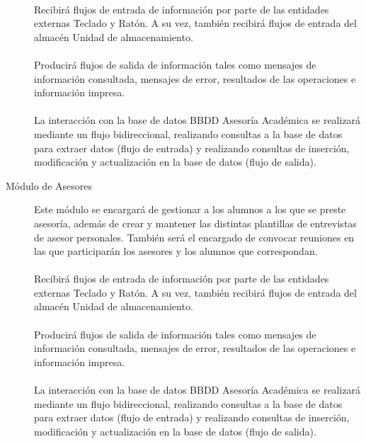\begin{description}
   \paragraph{}Recibirá flujos de entrada de información por parte de las
   entidades externas Teclado y Ratón. A su vez, también recibirá flujos de
   entrada del almacén Unidad de almacenamiento.

   \paragraph{}Producirá flujos de salida de información tales como mensajes de
   información consultada, mensajes de error, resultados de las operaciones e
   información impresa.

   \paragraph{}La interacción con la base de datos BBDD Asesoría Académica se
   realizará mediante un flujo bidireccional, realizando consultas a la base de
   datos para extraer datos (flujo de entrada) y realizando consultas de
   inserción, modificación y actualización en la base de datos (flujo de
   salida).

   \item[Módulo de Asesores] Este módulo se encargará de gestionar a los alumnos
   a los que se preste asesoría, además de crear y mantener las distintas
   plantillas de entrevistas de asesor personales. También será el encargado
   de convocar reuniones en las que participarán los asesores y los alumnos
   que correspondan.

   \paragraph{}Recibirá flujos de entrada de información por parte de las
   entidades externas Teclado y Ratón. A su vez, también recibirá flujos de
   entrada del almacén Unidad de almacenamiento.

   \paragraph{}Producirá flujos de salida de información tales como mensajes de
   información consultada, mensajes de error, resultados de las operaciones e
   información impresa.

   \paragraph{}La interacción con la base de datos BBDD Asesoría Académica se
   realizará mediante un flujo bidireccional, realizando consultas a la base de
   datos para extraer datos (flujo de entrada) y realizando consultas de
   inserción, modificación y actualización en la base de datos (flujo de
   salida).


\end{description}
